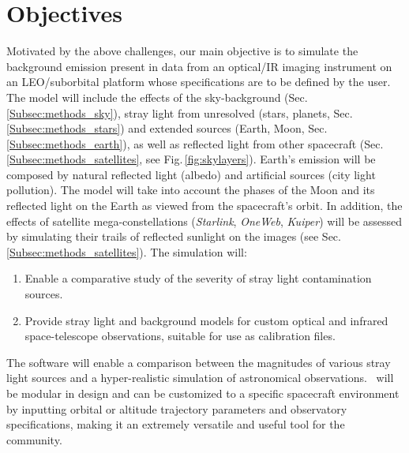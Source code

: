 \documentclass[usenames,dvipsnames,modern]{CLASS_FILES/aastex631}  %
\begin{document}
% 
\section{Objectives}
\label{Sec:objectives}

Motivated by the above challenges, our main objective is to simulate the background emission present in data from an optical/IR imaging instrument on an LEO/suborbital platform whose specifications are to be defined by the user. The model will include the effects of the sky-background (Sec.\,\ref{Subsec:methods_sky}), stray light from unresolved (stars, planets, Sec.\,\ref{Subsec:methods_stars}) and extended sources (Earth, Moon, Sec.\,\ref{Subsec:methods_earth}), as well as reflected light from other spacecraft (Sec.\,\ref{Subsec:methods_satellites}, see Fig.\,\ref{fig:skylayers}). Earth’s emission will be composed by natural reflected light (albedo) and artificial sources (city light pollution). The model will take into account the phases of the Moon and its reflected light on the Earth as viewed from the spacecraft's orbit. In addition, the effects of satellite mega-constellations (\emph{Starlink}, \emph{OneWeb}, \emph{Kuiper}) will be assessed by simulating their trails of reflected sunlight on the images (see Sec.\,\ref{Subsec:methods_satellites}). The simulation will:

\begin{enumerate}
    \item Enable a comparative study of the severity of stray light contamination sources.
    \item Provide stray light and background models for custom optical and infrared space-telescope observations, suitable for use as calibration files.
\end{enumerate}


The software will enable a comparison between the magnitudes of various stray light sources and a hyper-realistic simulation of astronomical observations. \MyName\ will be modular in design and can be customized to a specific spacecraft environment by inputting orbital or altitude trajectory parameters and observatory specifications, making it an extremely versatile and useful tool for the community.

\end{document}

